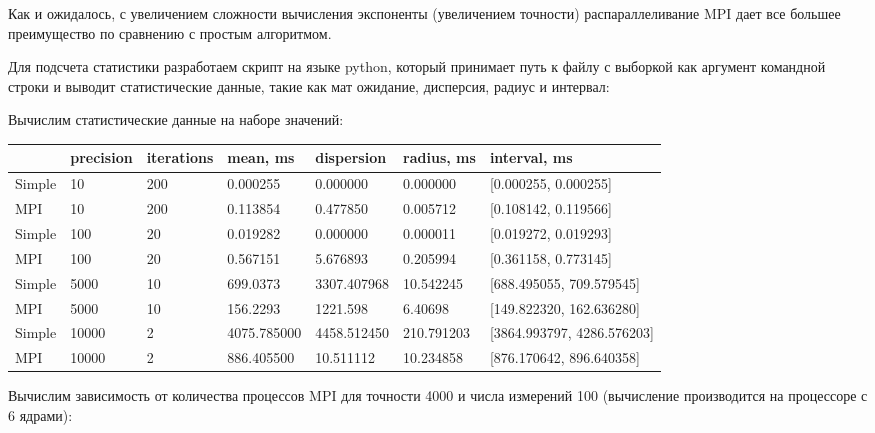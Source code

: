 \documentclass[14pt,a4paper,report]{report}
\begin{document}
Как и ожидалось, с увеличением сложности вычисления экспоненты (увеличением точности) распараллеливание MPI дает все большее преимущество по сравнению с простым алгоритмом.

Для подсчета статистики разработаем скрипт на языке python, который принимает путь к файлу с выборкой как аргумент командной строки и выводит статистические данные, такие как мат ожидание, дисперсия, радиус и интервал:



Вычислим статистические данные на наборе значений:

\begin{table}[h!]
	\centering
	\bgroup
	\def\arraystretch{1}
	\begin{tabular}{ | m{0.95cm} | m{1.5cm} | m{1.5cm} | m{2.2cm} | m{2.2cm} | m{2.2cm} | m{4.1cm} | }
		\hline
		 & precision & iterations & mean, ms & dispersion & radius, ms & interval, ms \\ \hline
		Simple & 10 & 200 & 0.000255 & 0.000000 & 0.000000 & [0.000255, 0.000255] \\ \hline
		MPI & 10 & 200 & 0.113854 & 0.477850 & 0.005712 & [0.108142, 0.119566] \\ \hline \hline
		Simple & 100 & 20 & 0.019282 & 0.000000 & 0.000011 & [0.019272, 0.019293] \\ \hline
		MPI & 100 & 20 & 0.567151 & 5.676893 & 0.205994 & [0.361158, 0.773145] \\ \hline \hline
		Simple & 5000 & 10 & 699.0373 & 3307.407968 & 10.542245 & [688.495055, 709.579545] \\ \hline
		MPI & 5000 & 10 & 156.2293 & 1221.598 & 6.40698 & [149.822320, 162.636280] \\ \hline \hline
		Simple & 10000 & 2 & 4075.785000 & 4458.512450 & 210.791203 & [3864.993797, 4286.576203] \\ \hline
		MPI & 10000 & 2 & 886.405500 & 10.511112 & 10.234858 & [876.170642, 896.640358] \\
		\hline
	\end{tabular}
	\egroup
\end{table}

\clearpage

Вычислим зависимость от количества процессов MPI для точности 4000 и числа измерений 100 (вычисление производится на процессоре с 6 ядрами):
\end{document}
